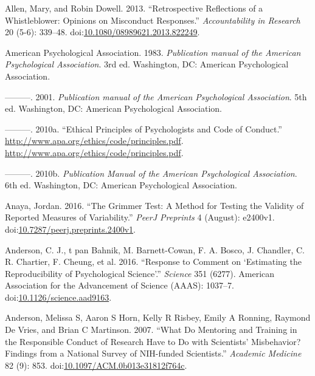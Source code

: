 \documentclass[a5paper]{book}
\begin{document}
\hypertarget{ref-doi:10.1080ux2f08989621.2013.822249}{}
Allen, Mary, and Robin Dowell. 2013. ``Retrospective Reflections of a
Whistleblower: Opinions on Misconduct Responses.'' \emph{Accountability
in Research} 20 (5-6): 339--48.
doi:\href{https://doi.org/10.1080/08989621.2013.822249}{10.1080/08989621.2013.822249}.

\hypertarget{ref-American_Psychological_Association1983-yf}{}
American Psychological Association. 1983. \emph{Publication manual of
the American Psychological Association}. 3rd ed. Washington, DC:
American Psychological Association.

\hypertarget{ref-American_Psychological_Association2001-uw}{}
---------. 2001. \emph{Publication manual of the American Psychological
Association}. 5th ed. Washington, DC: American Psychological
Association.

\hypertarget{ref-apa2010}{}
---------. 2010a. ``Ethical Principles of Psychologists and Code of
Conduct.'' \url{http://www.apa.org/ethics/code/principles.pdf}.
\url{http://www.apa.org/ethics/code/principles.pdf}.

\hypertarget{ref-isbn:9781433805615}{}
---------. 2010b. \emph{Publication Manual of the American Psychological
Association}. 6th ed. Washington, DC: American Psychological
Association.

\hypertarget{ref-doi:10.7287ux2fpeerj.preprints.2400v1}{}
Anaya, Jordan. 2016. ``The Grimmer Test: A Method for Testing the
Validity of Reported Measures of Variability.'' \emph{PeerJ Preprints} 4
(August): e2400v1.
doi:\href{https://doi.org/10.7287/peerj.preprints.2400v1}{10.7287/peerj.preprints.2400v1}.

\hypertarget{ref-doi:10.1126ux2fscience.aad9163}{}
Anderson, C. J., t pan Bahnik, M. Barnett-Cowan, F. A. Bosco, J.
Chandler, C. R. Chartier, F. Cheung, et al. 2016. ``Response to Comment
on `Estimating the Reproducibility of Psychological Science'.''
\emph{Science} 351 (6277). American Association for the Advancement of
Science (AAAS): 1037--7.
doi:\href{https://doi.org/10.1126/science.aad9163}{10.1126/science.aad9163}.

\hypertarget{ref-doi:10.1097ux2fACM.0b013e31812f764c}{}
Anderson, Melissa S, Aaron S Horn, Kelly R Risbey, Emily A Ronning,
Raymond De Vries, and Brian C Martinson. 2007. ``What Do Mentoring and
Training in the Responsible Conduct of Research Have to Do with
Scientists' Misbehavior? Findings from a National Survey of NIH-funded
Scientists.'' \emph{Academic Medicine} 82 (9): 853.
doi:\href{https://doi.org/10.1097/ACM.0b013e31812f764c}{10.1097/ACM.0b013e31812f764c}.
\end{document}
